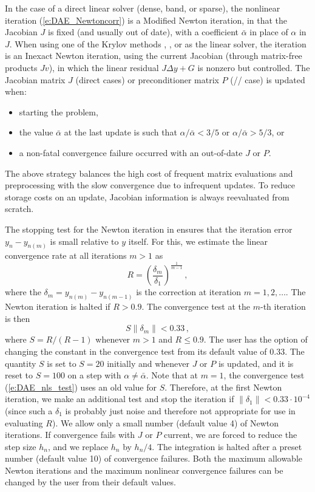 In the case of a direct linear solver (dense, band, or sparse), the nonlinear 
iteration (\ref{e:DAE_Newtoncorr}) is a Modified Newton iteration, in
that the Jacobian $J$ is fixed (and usually out of date), with a coefficient 
$\bar\alpha$ in place of $\alpha$ in $J$. When using one of the Krylov methods
{\spgmr}, {\spbcg}, or {\sptfqmr} as the linear solver, the iteration is an
Inexact Newton iteration, using the current Jacobian (through matrix-free products
$Jv$), in which the linear residual $J\Delta y + G$ is nonzero but controlled.
The Jacobian matrix $J$ (direct cases) or preconditioner matrix $P$ 
({\spgmr}/{\spbcg}/{\sptfqmr} case) is updated when:
\begin{itemize}
\item starting the problem,
\item the value $\bar\alpha$ at the last update is such that
  $\alpha / {\bar\alpha} < 3/5$ or $\alpha / {\bar\alpha} > 5/3$, or
\item a non-fatal convergence failure occurred with an out-of-date $J$ or $P$.
\end{itemize}
The above strategy balances the high cost of frequent matrix evaluations
and preprocessing with the slow convergence due to infrequent updates.
To reduce storage costs on an update, Jacobian information is always
reevaluated from scratch.

The stopping test for the Newton iteration
in {\idas} ensures that the iteration error $y_n - y_{n(m)}$ is small relative
to $y$ itself. For this, we estimate the linear convergence rate at all 
iterations $m>1$ as
\begin{equation*}
R = \left( \frac{\delta_m}{\delta_1} \right)^{\frac{1}{m-1}} \, , 
\end{equation*}
where the $\delta_m = y_{n(m)} - y_{n(m-1)}$ is the correction at
iteration $m=1,2,\ldots$. The Newton iteration is halted if $R>0.9$.
The convergence test at the $m$-th iteration is then
\begin{equation}\label{e:DAE_nls_test}
S \| \delta_m \| < 0.33 \, ,
\end{equation}
where $S = R/(R-1)$ whenever $m>1$ and $R\le 0.9$. The user has the
option of changing the constant in the convergence test from its default 
value of $0.33$.
%
The quantity $S$ is set to $S=20$ initially and whenever $J$ or $P$ is
updated, and it is reset to $S=100$ on a step with $\alpha \neq \bar\alpha$.
Note that at $m=1$, the convergence test (\ref{e:DAE_nls_test}) uses an old 
value for $S$. Therefore, at the first Newton iteration, we make an additional
test and stop the iteration if $\|\delta_1\| < 0.33 \cdot 10^{-4}$
(since such a $\delta_1$ is probably just noise and therefore not appropriate 
for use in evaluating $R$).
%
We allow only a small number (default value 4) of Newton iterations.
If convergence fails with $J$ or $P$ current, 
we are forced to reduce the step size $h_n$, and we replace $h_n$ by $h_n/4$.
The integration is halted after a preset number (default value 10)
of convergence failures. Both the maximum allowable Newton iterations
and the maximum nonlinear convergence failures can be changed by the user
from their default values.


